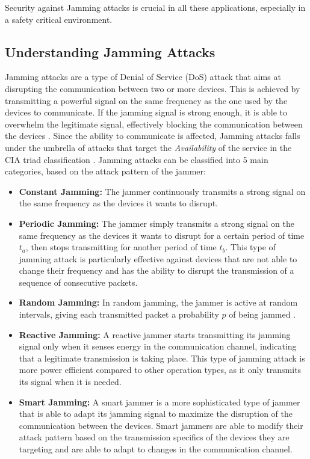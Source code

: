 \documentclass[futureinternet,article,submit,pdftex,moreauthors]{Definitions/mdpi}
\begin{document}
Security against Jamming attacks is crucial in all these applications, especially in a safety critical environment. 

\subsection{Understanding Jamming Attacks}

Jamming attacks are a type of Denial of Service (DoS) attack that aims at disrupting the communication between two or more devices. 
This is achieved by transmitting a powerful signal on the same frequency as the one used by the devices to communicate. If the jamming signal is strong enough, 
it is able to overwhelm the legitimate signal, effectively blocking the communication between the devices \cite{DroneCommHassija}. 
Since the ability to communicate is affected, Jamming attacks falls under the umbrella of attacks that target the \textit{Availability} of the service in the CIA triad classification \cite{DataIntegrityCawthra}. 
Jamming attacks can be classified into 5 main categories, based on the attack pattern of the jammer: 

\begin{itemize}
    \item \textbf{Constant Jamming:} The jammer continuously transmits a strong signal on the same frequency as the devices it wants to disrupt. 
    \item \textbf{Periodic Jamming:} The jammer simply transmits a strong signal on the same frequency as the devices it wants to disrupt 
    for a certain period of time \(t_a\), then stops transmitting for another period of time \(t_b\). This type of jamming attack is particularly effective against devices 
    that are not able to change their frequency and has the ability to disrupt the transmission of a sequence of consecutive packets. \cite{VANETsAI-Lyamin}
    \item \textbf{Random Jamming:} In random jamming, the jammer is active at random intervals, giving each transmitted packet a probability 
    \(p\) of being jammed \cite{VANETsAI-Lyamin}. 
    \item \textbf{Reactive Jamming:} A reactive jammer starts transmitting its jamming signal only when it senses energy in the communication channel, 
    indicating that a legitimate transmission is taking place. This type of jamming attack is more power efficient compared to other 
    operation types, as it only transmits its signal when it is needed\cite{MLMisbehavior5GBoualouache}.
    \item \textbf{Smart Jamming:} A smart jammer is a more sophisticated type of jammer that is able to adapt its jamming signal to 
    maximize the disruption of the communication between the devices. Smart jammers are able to modify their attack pattern based on the 
    transmission specifics of the devices they are targeting and are able to adapt to changes in the communication channel\cite{AntiJammingV2V-Feng}.
\end{itemize}
\end{document}
